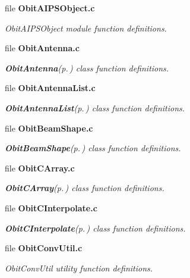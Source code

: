 \begin{CompactItemize}
\item 
file {\bf Obit\-AIPSObject.c}
\begin{CompactList}\small\item\em Obit\-AIPSObject module function definitions. \item\end{CompactList}

\item 
file {\bf Obit\-Antenna.c}
\begin{CompactList}\small\item\em {\bf Obit\-Antenna}{\rm (p.\,\pageref{structObitAntenna})} class function definitions. \item\end{CompactList}

\item 
file {\bf Obit\-Antenna\-List.c}
\begin{CompactList}\small\item\em {\bf Obit\-Antenna\-List}{\rm (p.\,\pageref{structObitAntennaList})} class function definitions. \item\end{CompactList}

\item 
file {\bf Obit\-Beam\-Shape.c}
\begin{CompactList}\small\item\em {\bf Obit\-Beam\-Shape}{\rm (p.\,\pageref{structObitBeamShape})} class function definitions. \item\end{CompactList}

\item 
file {\bf Obit\-CArray.c}
\begin{CompactList}\small\item\em {\bf Obit\-CArray}{\rm (p.\,\pageref{structObitCArray})} class function definitions. \item\end{CompactList}

\item 
file {\bf Obit\-CInterpolate.c}
\begin{CompactList}\small\item\em {\bf Obit\-CInterpolate}{\rm (p.\,\pageref{structObitCInterpolate})} class function definitions. \item\end{CompactList}

\item 
file {\bf Obit\-Conv\-Util.c}
\begin{CompactList}\small\item\em Obit\-Conv\-Util utility function definitions. \item\end{CompactList}


\end{CompactItemize}
